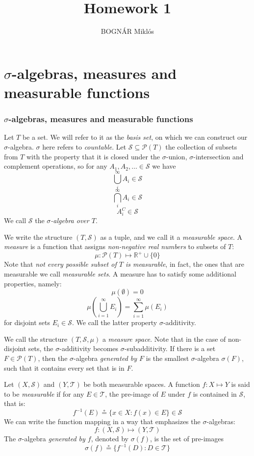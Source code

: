 \documentclass[xcolor=dvipsnames]{beamer}
\author{BOGNÁR Miklós}
\title{Homework 1}
\begin{document}
\maketitle
\section{$\sigma$-algebras, measures and measurable functions}
\begin{frame}
\frametitle{$\sigma$-algebras, measures and measurable functions}
Let $T$ be a set. We will refer to it as the \emph{basis set}, on which we can construct our $\sigma$-algebra. $\sigma$ here refers to \emph{countable}. Let $\mathcal{S} \subseteq \mathcal{P}(T)$ the collection of subsets from $T$ with the property that it is closed under the $\sigma$-union, $\sigma$-intersection and complement operations, so for any $A_1, A_2, \dots \in \mathcal{S}$ we have
\[
	\bigcup_i^{\infty}{A_i} \in \mathcal{S}
\]
\[
	\bigcap_i^{\infty}{A_i} \in \mathcal{S}
\]
\[
	A_i^C \in \mathcal{S}
\]
We call $\mathcal{S}$ the \emph{$\sigma$-algebra over $T$}.
\end{frame}
\begin{frame}
We write the structure $(T, \mathcal{S})$ as a tuple, and we call it a \emph{measurable space}. A \emph{measure} is a function that assigns \emph{non-negative real numbers} to subsets of $T$:
\[
	\mu: \mathcal{P}(T) \mapsto \mathbb{R}^{+} \cup \{0\} 
\]
Note that \emph{not every possible subset of $T$ is measurable}, in fact, the ones that are measurable we call \emph{measurable sets}. A measure has to satisfy some additional properties, namely:
\[
	\mu(\emptyset) = 0
\]
\[
	\mu(\bigcup_{i=1}^{\infty}{E_i}) = \sum_{i=1}^{\infty}{\mu(E_i)}
\]
for disjoint sets $E_i \in \mathcal{S}$. We call the latter property $\sigma$-additivity.
\end{frame}
\begin{frame}
We call the structure $(T, \mathcal{S}, \mu)$ a \emph{measure space}. Note that in the case of non-disjoint sets, the $\sigma$-additivity becomes $\sigma$-subadditivity. If there is a set $F \in \mathcal{P}(T)$, then the $\sigma$-algebra \emph{generated by $F$} is the smallest $\sigma$-algebra $\sigma(F)$, such that it contains every set that is in $F$.
\end{frame}
\begin{frame}
Let $(X, \mathcal{S})$ and $(Y, \mathcal{T})$ be both measurable spaces. A function $f : X \mapsto Y$ is said to be \emph{measurable} if for any $E \in \mathcal{T}$, the pre-image of $E$ under $f$ is contained in $\mathcal{S}$, that is:
\[
	f^{-1}(E) \circeq \{x \in X : f(x) \in E\} \in \mathcal{S}
\]
We can write the function mapping in a way that emphasizes the $\sigma$-algebras:
\[
	f : (X, \mathcal{S}) \mapsto (Y, \mathcal{T})
\]
The $\sigma$-algebra \emph{generated by $f$}, denoted by $\sigma(f)$, is the set of pre-images
\[
	\sigma(f) \circeq \{f^{-1}(D) : D \in \mathcal{T}\}
\]
\end{frame}
\end{document}
